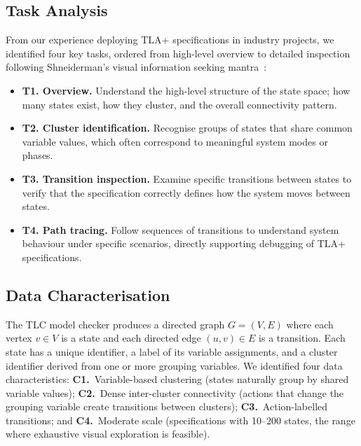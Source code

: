 \documentclass[conference]{IEEEtran}
\begin{document}
\subsection{Task Analysis}

From our experience deploying TLA+ specifications in industry projects, we identified four key tasks, ordered from high-level overview to detailed inspection following Shneiderman's visual information seeking mantra~\cite{shneiderman1996eyes}:

\begin{itemize}
\item \textbf{T1. Overview.} Understand the high-level structure of the state space; how many states exist, how they cluster, and the overall connectivity pattern.
\item \textbf{T2. Cluster identification.} Recognise groups of states that share common variable values, which often correspond to meaningful system modes or phases.
\item \textbf{T3. Transition inspection.} Examine specific transitions between states to verify that the specification correctly defines how the system moves between states.
\item \textbf{T4. Path tracing.} Follow sequences of transitions to understand system behaviour under specific scenarios, directly supporting debugging of TLA+ specifications.
\end{itemize}

\subsection{Data Characterisation}

The TLC model checker produces a directed graph $G = (V, E)$ where each vertex $v \in V$ is a state and each directed edge $(u, v) \in E$ is a transition. Each state has a unique identifier, a label of its variable assignments, and a cluster identifier derived from one or more grouping variables. We identified four data characteristics: \textbf{C1.}~Variable-based clustering (states naturally group by shared variable values); \textbf{C2.}~Dense inter-cluster connectivity (actions that change the grouping variable create transitions between clusters); \textbf{C3.}~Action-labelled transitions; and \textbf{C4.}~Moderate scale (specifications with 10--200 states, the range where exhaustive visual exploration is feasible).
\end{document}
